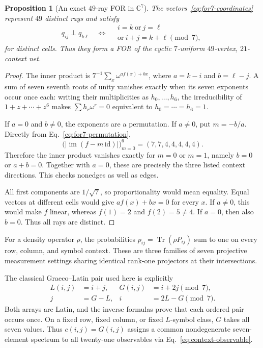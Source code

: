 \documentclass[aps,pra,reprint,superscriptaddress,longbibliography,nofootinbib,floatfix,10pt]{revtex4-2}
\newtheorem{proposition}[theorem]{Proposition}
\theoremstyle{definition}\newtheorem{definition}[theorem]{Definition}
\theoremstyle{remark}\newtheorem{remark}[theorem]{Remark}
\begin{document}
\begin{proposition}[An exact $49$-ray FOR in $\mathbb C^7$]\label{prop:cyclic7-for}
The vectors~\eqref{eq:for7-coordinates} represent $49$ distinct rays and satisfy
\begin{equation}\label{eq:for7-faithfulness}
q_{ij}\perp q_{k\ell}\quad\Longleftrightarrow\quad
\begin{gathered}
i=k\ \text{or}\ j=\ell\\
\text{or}\ i+j=k+\ell\pmod7,
\end{gathered}
\end{equation}
for distinct cells. Thus they form a FOR of the cyclic $7$-uniform $49$-vertex, $21$-context net.
\end{proposition}
\begin{proof}
The inner product is $7^{-1}\sum_x\omega^{a f(x)+b x}$, where $a=k-i$ and $b=\ell-j$. A sum of seven seventh roots of unity vanishes exactly when its seven exponents occur once each: writing their multiplicities as $h_0,\ldots,h_6$, the irreducibility of $1+z+\cdots+z^6$ makes $\sum h_r\omega^r=0$ equivalent to $h_0=\cdots=h_6=1$.

If $a=0$ and $b\ne0$, the exponents are a permutation. If $a\ne0$, put $m=-b/a$. Directly from Eq.~\eqref{eq:for7-permutation},
\[
\bigl(|\operatorname{im}(f-m\,\mathrm{id})|\bigr)_{m=0}^{6}
=(7,7,4,4,4,4,4).
\]
Therefore the inner product vanishes exactly for $m=0$ or $m=1$, namely $b=0$ or $a+b=0$. Together with $a=0$, these are precisely the three listed context directions. This checks nonedges as well as edges.

All first components are $1/\sqrt7$, so proportionality would mean equality. Equal vectors at different cells would give $a f(x)+b x=0$ for every $x$. If $a\ne0$, this would make $f$ linear, whereas $f(1)=2$ and $f(2)=5\ne4$. If $a=0$, then also $b=0$. Thus all rays are distinct.
\end{proof}


For a density operator $\rho$, the probabilities $p_{ij}=\operatorname{Tr}(\rho P_{ij})$ sum to one on every row, column, and symbol context. These are three families of seven projective measurement settings sharing identical rank-one projectors at their intersections.

The classical Graeco--Latin pair used here is explicitly
\begin{equation}\label{eq:graeco7-pair}
\begin{aligned}
L(i,j)&=i+j,&G(i,j)&=i+2j\pmod7,\\
j&=G-L,&i&=2L-G\pmod7.
\end{aligned}
\end{equation}
Both arrays are Latin, and the inverse formulas prove that each ordered pair occurs once. On a fixed row, fixed column, or fixed $L$-symbol class, $G$ takes all seven values. Thus $c(i,j)=G(i,j)$ assigns a common nondegenerate seven-element spectrum to all twenty-one observables via Eq.~\eqref{eq:context-observable}.
\end{document}
